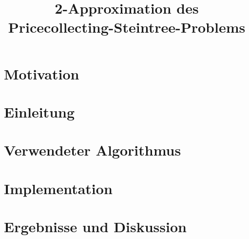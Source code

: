 \documentclass[a4paper,10pt]{article}
\title{2-Approximation des Pricecollecting-Steintree-Problems}
\author{}
\begin{document}
\maketitle

\begin{abstract}

\end{abstract}

\section{Motivation}

\section{Einleitung}

\section{Verwendeter Algorithmus}

\section{Implementation}

\section{Ergebnisse und Diskussion}
\end{document}
